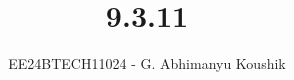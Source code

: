 \documentclass[journal]{IEEEtran}
\begin{document}

\vspace{3cm}

\title{9.3.11}
\author{EE24BTECH11024 - G. Abhimanyu Koushik}
{\let\newpage\relax\maketitle}

\renewcommand{\thefigure}{\theenumi}
\renewcommand{\thetable}{\theenumi}
\setlength{\intextsep}{10pt} %


\renewcommand{\thetable}{\theenumi}
\end{document}
